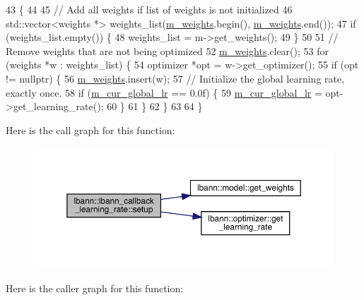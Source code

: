\begin{DoxyCode}
43                                                  \{
44 
45   \textcolor{comment}{// Add all weights if list of weights is not initialized}
46   std::vector<weights *> weights\_list(\hyperlink{classlbann_1_1lbann__callback__learning__rate_a0b02e82190e04a22ab26d858041915d7}{m\_weights}.begin(), \hyperlink{classlbann_1_1lbann__callback__learning__rate_a0b02e82190e04a22ab26d858041915d7}{m\_weights}.end());
47   \textcolor{keywordflow}{if} (weights\_list.empty()) \{
48     weights\_list = m->get\_weights();
49   \}
50 
51   \textcolor{comment}{// Remove weights that are not being optimized}
52   \hyperlink{classlbann_1_1lbann__callback__learning__rate_a0b02e82190e04a22ab26d858041915d7}{m\_weights}.clear();
53   \textcolor{keywordflow}{for} (weights *w : weights\_list) \{
54     optimizer *opt = w->get\_optimizer();
55     \textcolor{keywordflow}{if} (opt != \textcolor{keyword}{nullptr}) \{
56       \hyperlink{classlbann_1_1lbann__callback__learning__rate_a0b02e82190e04a22ab26d858041915d7}{m\_weights}.insert(w);
57       \textcolor{comment}{// Initialize the global learning rate, exactly once.}
58       \textcolor{keywordflow}{if} (\hyperlink{classlbann_1_1lbann__callback__learning__rate_a97194f282c29a748c915d9811a8a99fb}{m\_cur\_global\_lr} == 0.0f) \{
59         \hyperlink{classlbann_1_1lbann__callback__learning__rate_a97194f282c29a748c915d9811a8a99fb}{m\_cur\_global\_lr} = opt->get\_learning\_rate();
60       \}
61     \}
62   \}
63 
64 \}
\end{DoxyCode}
Here is the call graph for this function\+:\nopagebreak
\begin{figure}[H]
\begin{center}
\leavevmode
\includegraphics[width=350pt]{classlbann_1_1lbann__callback__learning__rate_a501f31a6b8fde1282a60e4b347e8d9d3_cgraph}
\end{center}
\end{figure}
Here is the caller graph for this function\+:\nopagebreak
